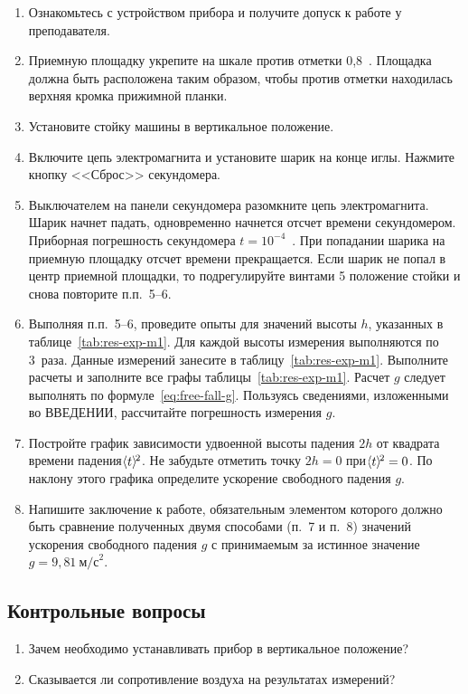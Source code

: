 \documentclass[a4paper, 12pt]{extarticle}
\begin{document}
\begin{enumerate}
\item Ознакомьтесь с устройством прибора и получите допуск к работе у преподавателя. 
\item Приемную площадку укрепите на шкале против отметки 0,8~. Площадка должна быть расположена таким образом, чтобы против отметки находилась верхняя кромка прижимной планки. %
\item Установите стойку машины в вертикальное положение.
\item Включите цепь электромагнита и установите шарик на конце иглы. Нажмите кнопку <<Сброс>> секундомера.
\item Выключателем на панели секундомера разомкните цепь электромагнита. Шарик начнет падать, одновременно начнется отсчет времени секундомером. Приборная погрешность секундомера $t = 10^{-4}$~. При попадании шарика на приемную площадку отсчет времени прекращается. Если шарик не попал в центр приемной площадки, то подрегулируйте винтами 5 положение стойки и снова повторите п.п.~5--6. %
\item Выполняя п.п.~5--6, проведите опыты для значений высоты $h$, указанных в таблице~\ref{tab:res-exp-m1}. Для каждой высоты измерения выполняются по 3~раза. Данные измерений занесите в таблицу~\ref{tab:res-exp-m1}.  Выполните расчеты и заполните все графы таблицы~\ref{tab:res-exp-m1}. Расчет $g$ следует выполнять по формуле~\ref{eq:free-fall-g}. Пользуясь сведениями, изложенными во ВВЕДЕНИИ, рассчитайте погрешность измерения $g$. %
\item Постройте график зависимости удвоенной высоты падения $2h$ от квадрата времени падения $\hspace{-3pt}\left<t\right>\hspace{-3pt}^2$. Не забудьте отметить точку $2h = 0$ при $\hspace{-3pt}\left<t\right>\hspace{-3pt}^2 = 0$. По наклону этого графика определите ускорение свободного падения $g$.
\item Напишите заключение к работе, обязательным элементом которого должно быть сравнение полученных двумя способами (п.~7 и п.~8) значений ускорения свободного падения $g$ с принимаемым за истинное значение $g = 9,81\   \text{м/с}^2$. %
\end{enumerate}

\subsection{Контрольные вопросы}
\begin{enumerate}
\item Зачем необходимо устанавливать прибор в вертикальное положение?
\item Сказывается ли сопротивление воздуха на результатах измерений?
\end{enumerate}
\end{document}
